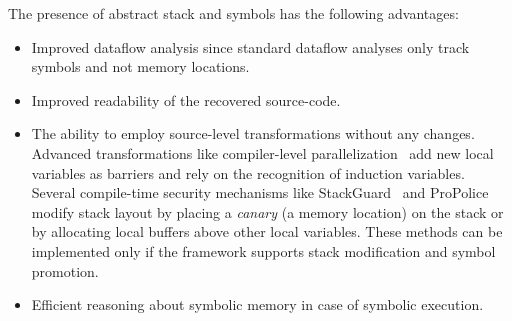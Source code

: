  The presence of abstract stack and symbols has the following advantages:
\begin{itemize}
\renewcommand{\labelitemi}{\textbf{$\rightarrow$}}
\vspace{-3ex}
\item Improved dataflow analysis since standard dataflow analyses only track symbols and not memory locations.
\item Improved readability of the recovered source-code.
\item The ability to employ source-level transformations without any changes. Advanced transformations like compiler-level parallelization~\cite{ParallelAugust,ParallelSohi} add new local variables as barriers and rely on the recognition of induction variables. Several compile-time security mechanisms like StackGuard~\cite{stackguard} and ProPolice~\cite{propolice1} modify stack layout by placing a \emph{canary} (a memory location) on the stack or by allocating local buffers above other local variables. These methods can be implemented only if the framework supports stack modification and symbol promotion.
\item Efficient reasoning about symbolic memory in case of symbolic execution.

\end{itemize}
 

